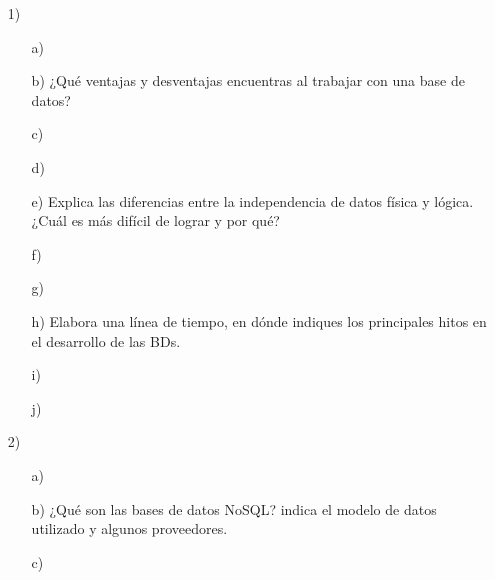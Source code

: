 \documentclass[a4paper, 12pt]{report}
\begin{document}
\begin{enumerate}
\item[1)]{
\begin{enumerate}
    \item[a)]{}
    \item[b)]{¿Qué ventajas y desventajas encuentras al trabajar con una base de datos? }%
    \item[c)]{}
    \item[d)]{}
    \item[e)]{Explica las diferencias entre la independencia de datos física y lógica. ¿Cuál es más difícil de lograr y por qué?  }%
    \item[f)]{}
    \item[g)]{}
    \item[h)]{Elabora una línea de tiempo, en dónde indiques los principales hitos en el desarrollo de las BDs.}%
    \item[i)]{}
    \item[j)]{}
\end{enumerate}
}
\item[2)]{
\begin{enumerate}
    \item[a)]{}
    \item[b)]{¿Qué son las bases de datos NoSQL? indica el modelo de datos utilizado y algunos proveedores. }%
    \item[c)]{}
\end{enumerate}
}
\end{enumerate}
\end{document}
